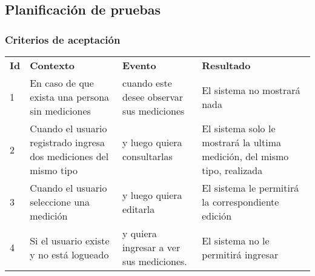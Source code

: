 \begin{comment}


\subsubsection{Creación de aplicación  }
\subsubsection{Creación de modulo de mediciones}
\subsubsection{Exposición de métodos como servicios de API}
\subsubsection{Adaptación de salida de métodos a formato Json}
\subsubsection{Creación de base de datos inicial}
\end{comment}


\clearpage
\subsection{Planificación de pruebas}
\subsubsection{Criterios de aceptación}

\begin{center}
\begin{longtable}{|p{0.5cm}|p{4cm}|p{4cm}|p{4.5cm}|}
\hline \hline \rowcolor[gray]{0.9}
	\multicolumn{4}{|c|}{\textbf{Criterio de aceptación}} \\
    \hline  \rowcolor[gray]{0.9}
        \textbf{Id} &
        \textbf{Contexto} &
        \textbf{Evento}&
        \textbf{Resultado} \\
    \hline
1&En caso de que exista una persona sin mediciones & cuando este desee observar sus mediciones  & El sistema no mostrará nada \\ \hline
 
2& Cuando el usuario registrado ingresa dos mediciones del mismo tipo  & y luego quiera consultarlas & El sistema solo le mostrará la ultima medición, del mismo tipo, realizada\\ \hline

3& Cuando el usuario seleccione una medición & y luego quiera editarla & El sistema le permitirá la correspondiente edición\\ \hline

4& Si el usuario existe y no está logueado & y quiera ingresar a ver sus mediciones. & El sistema no le permitirá ingresar\\ \hline
  \end{longtable}
\end{center}

